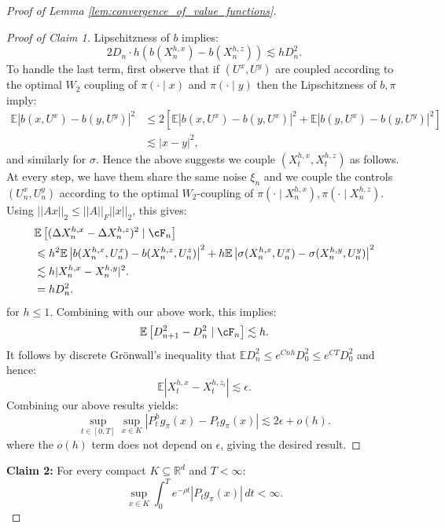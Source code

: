 \documentclass[11pt,oneside,reqno]{article}
\theoremstyle{plain}
\theoremstyle{definition}
\numberwithin{equation}{section}
\renewcommand{\leq}{\leqslant}
\newcommand{\R}{\mathbb{R}}
\newcommand{\E}{\mathbb{E}}
\begin{document}
\begin{proof}[Proof of Lemma \ref{lem:convergence_of_value_functions}]
\begin{proof}[Proof of Claim 1]
		\noindent Lipschitzness of $b$ implies:
		\[2 D_n \cdot h\left(b(X^{h,x}_n) - b(X^{h,z}_n)\right) \lesssim h D_n^2.\]
		\noindent To handle the last term, first observe that if $(U^x, U^y)$ are coupled according to the optimal $W_2$ coupling of $\pi(\cdot \mid x)$ and $\pi(\cdot \mid y)$ then
		the Lipschitzness of $b, \pi$ imply:
		\begin{align*}
			\E|b(x, U^x) - b(y, U^y)|^2 & \leq 2 \left[\E|b(x, U^x) - b(y, U^x)|^2 + \E |b(y, U^x) - b(y, U^y)|^2\right] \\
			& \lesssim |x-y|^2, 
		\end{align*}
		\noindent and similarly for $\sigma$. Hence the above suggests we couple $(X_t^{h,x}, X_t^{h,z})$ as follows. At every step, we have them share the same noise $\xi_n$ and
		we couple the controls $(U_n^x, U_n^y)$ according to the optimal $W_2$-coupling of $\pi(\cdot \mid X_n^{h,x}), \pi(\cdot \mid X_n^{h,z})$. Using $||Ax||_2 \leq ||A||_F ||x||_2$, this gives:
		\begin{align*}
			& \E\left[(\Delta X^{h,x}_n - \Delta X^{h,z}_n)^2 \mid \cF_n\right]\\
			& \leq h^2 \E \left|b(X_n^{h,x}, U_n^x) - b(X_n^{h,z}, U_n^z)\right|^2 + h \E \left|\sigma(X_n^{h,x}, U_n^x) - \sigma(X_n^{h,y}, U_n^y) \right|^2 \\
			& \lesssim h|X_n^{h,x} -X_n^{h,y}|^2.\\ 
			& = hD_n^2.
		\end{align*}
		\noindent for $h \leq 1$. Combining with our above work, this implies:
		\[\E \left[D_{n+1}^2 - D_n^2 \mid \cF_n\right] \lesssim h.\]
		\noindent It follows by discrete Gr\"onwall's inequality that $\E D_n^2 \leq e^{C nh} D_0^2 \leq e^{CT}D_0^2$ and hence:
		\[\E| X^{h,x}_t -  X^{h, z_i}_t| \lesssim \epsilon.\]
		\noindent Combining our above results yields:
		\[\sup_{t\in[0,T]} \sup_{x \in K}|P_t^h g_\pi(x) - P_t g_\pi(x)| \lesssim 2\epsilon + o(h). \]
		\noindent where the $o(h)$ term does not depend on $\epsilon$,  giving the desired result.
	\end{proof}

	\noindent \textbf{Claim 2:} For every compact $K \subseteq \R^d$ and $T<\infty$:
			\[
		\sup_{x \in K}\int_0^T e^{-\rho t} |P_t g_\pi(x)|\,dt < \infty.
		\]


\end{proof}
\end{document}
